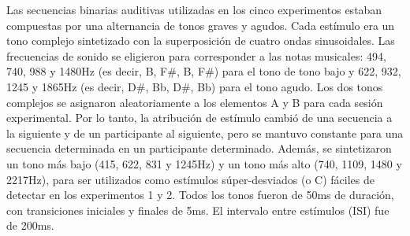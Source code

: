 
Las secuencias binarias auditivas utilizadas en los cinco experimentos estaban compuestas por una alternancia de tonos graves y agudos. Cada estímulo era un tono complejo sintetizado con la superposición de cuatro ondas sinusoidales. Las frecuencias de sonido se eligieron para corresponder a las notas musicales: 494, 740, 988 y 1480Hz (es decir, B, F\#, B, F\#) para el tono de tono bajo y 622, 932, 1245 y 1865Hz (es decir, D\#, Bb, D\#, Bb) para el tono agudo. Los dos tonos complejos se asignaron aleatoriamente a los elementos A y B para cada sesión experimental. Por lo tanto, la atribución de estímulo cambió de una secuencia a la siguiente y de un participante al siguiente, pero se mantuvo constante para una secuencia determinada en un participante determinado. Además, se sintetizaron un tono más bajo (415, 622, 831 y 1245Hz) y un tono más alto (740, 1109, 1480 y 2217Hz), para ser utilizados como estímulos súper-desviados (o C) fáciles de detectar en los experimentos 1 y 2. Todos los tonos fueron de 50ms de duración, con transiciones iniciales y finales de 5ms. El intervalo entre estímulos (ISI) fue de 200ms.


